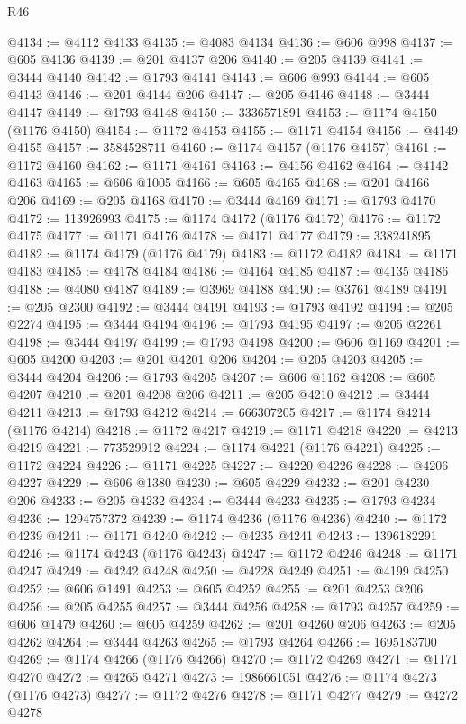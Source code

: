 \begin{lexlean}{R46}
\begin{coremodule}
@4134 := @4112 @4133
@4135 := @4083 @4134
@4136 := @606 @998
@4137 := @605 @4136
@4139 := @201 @4137 @206
@4140 := @205 @4139
@4141 := @3444 @4140
@4142 := @1793 @4141
@4143 := @606 @993
@4144 := @605 @4143
@4146 := @201 @4144 @206
@4147 := @205 @4146
@4148 := @3444 @4147
@4149 := @1793 @4148
@4150 := 3336571891
@4153 := @1174 @4150 (@1176 @4150)
@4154 := @1172 @4153
@4155 := @1171 @4154
@4156 := @4149 @4155
@4157 := 3584528711
@4160 := @1174 @4157 (@1176 @4157)
@4161 := @1172 @4160
@4162 := @1171 @4161
@4163 := @4156 @4162
@4164 := @4142 @4163
@4165 := @606 @1005
@4166 := @605 @4165
@4168 := @201 @4166 @206
@4169 := @205 @4168
@4170 := @3444 @4169
@4171 := @1793 @4170
@4172 := 113926993
@4175 := @1174 @4172 (@1176 @4172)
@4176 := @1172 @4175
@4177 := @1171 @4176
@4178 := @4171 @4177
@4179 := 338241895
@4182 := @1174 @4179 (@1176 @4179)
@4183 := @1172 @4182
@4184 := @1171 @4183
@4185 := @4178 @4184
@4186 := @4164 @4185
@4187 := @4135 @4186
@4188 := @4080 @4187
@4189 := @3969 @4188
@4190 := @3761 @4189
@4191 := @205 @2300
@4192 := @3444 @4191
@4193 := @1793 @4192
@4194 := @205 @2274
@4195 := @3444 @4194
@4196 := @1793 @4195
@4197 := @205 @2261
@4198 := @3444 @4197
@4199 := @1793 @4198
@4200 := @606 @1169
@4201 := @605 @4200
@4203 := @201 @4201 @206
@4204 := @205 @4203
@4205 := @3444 @4204
@4206 := @1793 @4205
@4207 := @606 @1162
@4208 := @605 @4207
@4210 := @201 @4208 @206
@4211 := @205 @4210
@4212 := @3444 @4211
@4213 := @1793 @4212
@4214 := 666307205
@4217 := @1174 @4214 (@1176 @4214)
@4218 := @1172 @4217
@4219 := @1171 @4218
@4220 := @4213 @4219
@4221 := 773529912
@4224 := @1174 @4221 (@1176 @4221)
@4225 := @1172 @4224
@4226 := @1171 @4225
@4227 := @4220 @4226
@4228 := @4206 @4227
@4229 := @606 @1380
@4230 := @605 @4229
@4232 := @201 @4230 @206
@4233 := @205 @4232
@4234 := @3444 @4233
@4235 := @1793 @4234
@4236 := 1294757372
@4239 := @1174 @4236 (@1176 @4236)
@4240 := @1172 @4239
@4241 := @1171 @4240
@4242 := @4235 @4241
@4243 := 1396182291
@4246 := @1174 @4243 (@1176 @4243)
@4247 := @1172 @4246
@4248 := @1171 @4247
@4249 := @4242 @4248
@4250 := @4228 @4249
@4251 := @4199 @4250
@4252 := @606 @1491
@4253 := @605 @4252
@4255 := @201 @4253 @206
@4256 := @205 @4255
@4257 := @3444 @4256
@4258 := @1793 @4257
@4259 := @606 @1479
@4260 := @605 @4259
@4262 := @201 @4260 @206
@4263 := @205 @4262
@4264 := @3444 @4263
@4265 := @1793 @4264
@4266 := 1695183700
@4269 := @1174 @4266 (@1176 @4266)
@4270 := @1172 @4269
@4271 := @1171 @4270
@4272 := @4265 @4271
@4273 := 1986661051
@4276 := @1174 @4273 (@1176 @4273)
@4277 := @1172 @4276
@4278 := @1171 @4277
@4279 := @4272 @4278

\end{coremodule}
\end{lexlean}
